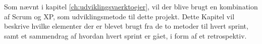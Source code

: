 Som nævnt i kapitel \ref{ch:udviklingsvaerktoejer}, vil der blive brugt en kombination af Scrum og XP, 
som udviklingsmetode til dette projekt. Dette  Kapitel vil beskrive hvilke elementer der er blevet brugt fra de
to metoder til hvert sprint, samt et sammendrag af hvordan hvert sprint er gået, i form af et retrospektiv.